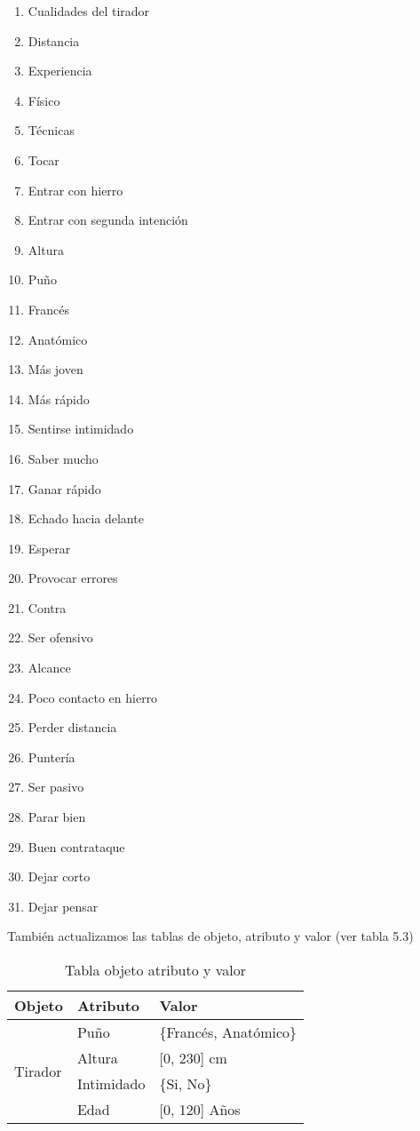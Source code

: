 \begin{enumerate}

  \item Cualidades del tirador
  \item Distancia
  \item Experiencia
  \item Físico
  \item Técnicas
  \item Tocar
  \item Entrar con hierro
  \item Entrar con segunda intención
  \item Altura
  \item Puño
  \item Francés
  \item Anatómico
  \item Más joven
  \item Más rápido
  \item Sentirse intimidado
  \item Saber mucho
  \item Ganar rápido
  \item Echado hacia delante
  \item Esperar
  \item Provocar errores
  \item Contra
  \item Ser ofensivo
  \item Alcance
  \item Poco contacto en hierro
  \item Perder distancia
  \item Puntería
  \item Ser pasivo
  \item Parar bien
  \item Buen contrataque
  \item Dejar corto
  \item Dejar pensar

\end{enumerate}

También actualizamos las tablas de objeto, atributo y valor (ver tabla 5.3)

\begin{table}[]
  \centering
  \caption{Tabla objeto atributo y valor}
  \label{tab:Tabla objeto atributo y valor}
  \begin{tabular}{lll}
    Objeto & Atributo & Valor \\ \hline
    \multicolumn{1}{l|}{\multirow{4}{*}{Tirador}} & Puño & \{Francés, Anatómico\} \\ \cline{2-3}
    \multicolumn{1}{l|}{} & Altura & {[}0, 230{]} cm \\ \cline{2-3}
    \multicolumn{1}{l|}{} & Intimidado & \{Si, No\} \\ \cline{2-3}
    \multicolumn{1}{l|}{} & Edad & {[}0, 120{]} Años \\ \cline{2-3}
  \end{tabular}
\end{table}

